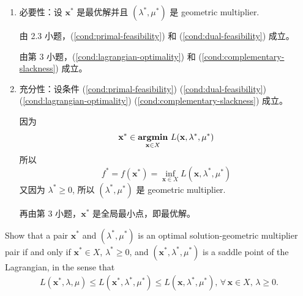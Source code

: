 \documentclass[11pt,letter,notitlepage]{article}
\DeclareMathOperator*{\argmin}{\bf argmin}
\begin{document}
\begin{solution}
	\begin{enumerate}
		\item 必要性：设 $\mathbf{x}^*$ 是最优解并且 $(\lambda^*,\mu^*)$ 是 geometric multiplier.

		      由 2.3 小题，(\ref{cond:primal-feasibility}) 和 (\ref{cond:dual-feasibility}) 成立。

		      由第 3 小题，(\ref{cond:lagrangian-optimality}) 和 (\ref{cond:complementary-slackness}) 成立。

		\item 充分性：设条件 (\ref{cond:primal-feasibility}) (\ref{cond:dual-feasibility}) (\ref{cond:lagrangian-optimality}) (\ref{cond:complementary-slackness}) 成立。

		      因为
		      $$\mathbf{x}^*\in\argmin_{\mathbf{x}\in X}\,L(\mathbf{x},\lambda^*,\mu^*)$$
		      所以
		      $$f^*=f(\mathbf{x}^*)= \inf_{\mathbf{x}\in X} L(\mathbf{x},\lambda^*,\mu^*)$$
		      又因为 $\lambda^* \geq 0$, 所以 $(\lambda^*,\mu^*)$ 是 geometric multiplier.

		      再由第 3 小题，$\mathbf{x}^*$ 是全局最小点，即最优解。
	\end{enumerate}
\end{solution}

\newpage
\begin{exercise}
	Show that a pair $\mathbf{x}^*$ and $(\lambda^*,\mu^*)$ is an optimal solution-geometric multiplier pair if and only if $\mathbf{x}^*\in X$, $\lambda^*\geq0$, and $(\mathbf{x}^*,\lambda^*,\mu^*)$ is a saddle point of the Lagrangian, in the sense that
	\begin{align}\label{cond:saddle-Lagrangian}
		L(\mathbf{x}^*,\lambda,\mu)\leq L(\mathbf{x}^*,\lambda^*,\mu^*)\leq L(\mathbf{x},\lambda^*,\mu^*),\,\forall\,\mathbf{x}\in X,\,\lambda\geq0.
	\end{align}
\end{exercise}
\end{document}
